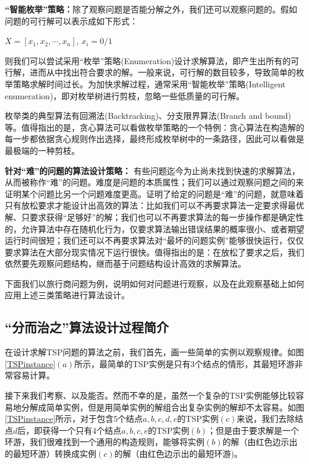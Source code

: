 	{\bf “智能枚举”策略：}除了观察问题是否能分解之外，我们还可以观察问题的。假如问题的可行解可以表示成如下形式：
		\begin{center}
	$X=[x_{1}, x_{2}, \cdots, x_{n}]$, $x_{i} = 0/1$
		\end{center}
	则我们可以尝试采用“枚举”策略(Enumeration)设计求解算法，即产生出所有的可行解，进而从中找出符合要求的解。一般来说，可行解的数目较多，导致简单的枚举策略求解时间过长。为加快求解过程，通常采用“智能枚举”策略(Intelligent enumeration)，即对枚举树进行剪枝，忽略一些低质量的可行解\cite{PapadimitriouBook}。
	
	枚举类的典型算法有回溯法(Backtracking)、分支限界算法(Branch and bound)等。值得指出的是，贪心算法可以看做枚举策略的一个特例：贪心算法在构造解的每一步都依据贪心规则作出选择，最终形成枚举树中的一条路径，因此可以看做是最极端的一种剪枝。
	
	{\bf 针对“难”的问题的算法设计策略：}	
有些问题迄今为止尚未找到快速的求解算法，从而被称作“难”的问题。难度是问题的本质属性；我们可以通过观察问题之间的来证明某个问题比另一个问题难度更高。证明了给定的问题是“难”的问题，就意味着只有放松要求才能设计出高效的算法：比如我们可以不再要求算法一定要求得最优解、只要求获得“足够好”的解；我们也可以不再要求算法的每一步操作都是确定性的，允许算法中存在随机化行为，仅要求算法输出错误结果的概率很小、或者期望运行时间很短；我们还可以不再要求算法对“最坏的问题实例”能够很快运行，仅仅要求算法在大部分现实情况下运行很快。值得指出的是：在放松了要求之后，我们依然要先观察问题结构，继而基于问题结构设计高效的求解算法\cite{HardBook}。

	
	下面我们以旅行商问题为例，说明如何对问题进行观察，以及在此观察基础上如何应用上述三类策略进行算法设计。
	
\subsection{“分而治之”算法设计过程简介}
	在设计求解TSP问题的算法之前，我们首先，画一些简单的实例以观察规律。如图\ref{TSPinstance}$(a)$所示，最简单的TSP实例是只有3个结点的情形，其最短环游非常容易计算。
		
	接下来我们考察、以及能否。然而不幸的是，虽然一个复杂的TSP实例能够比较容易地分解成简单实例，但是用简单实例的解组合出复杂实例的解却不太容易。如图\ref{TSPinstance}所示，对于包含5个结点$a, b, c, d, e$的TSP实例$(c)$来说，我们去除结点$d$后，即获得一个只有4个结点$a, b, c,   e$的TSP实例$(b)$；但是由于要求解是一个环游，我们很难找到一个通用的构造规则，能够将实例$(b)$的解（由红色边示出的最短环游）转换成实例$(c)$的解（由红色边示出的最短环游)。
	
